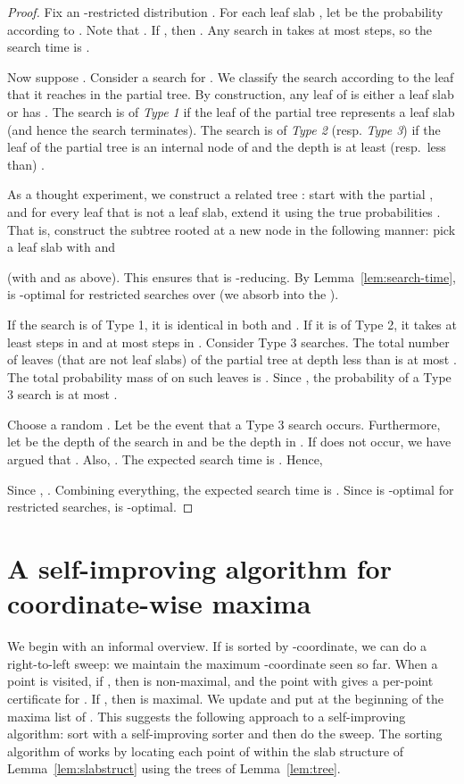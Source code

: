 \documentclass[letterpaper,11pt]{article}
\begin{document}
\begin{proof}
Fix an -restricted
distribution . For each leaf
slab , let  
be the probability according to 
. Note that 
.
If , 
then .
Any search in  takes at 
most  steps,
so the search time is
.

Now suppose . 
Consider a search for .
We classify the search according to 
the leaf that it reaches in
the partial tree.
By construction, any leaf 
of  is either a leaf slab or
has .
The search is of \emph{Type 1} 
if the leaf of the partial tree 
represents a leaf slab (and 
hence the search terminates). 
The search is of \emph{Type 2} 
(resp. \emph{Type 3}) if the 
leaf of the partial tree 
is an internal node of 
and the depth is at least 
(resp.~less than) . 

As a thought experiment,
we construct a related tree 
: start with the partial 
, and for every leaf that 
is not a leaf slab, extend it 
using the true 
probabilities . That  
is, construct the 
subtree rooted at a new node 
in the following manner: pick a leaf 
slab  with
 and
 
(with  and  as above). 
This ensures that  is 
-reducing.
By Lemma~\ref{lem:search-time},  
is -optimal for restricted 
searches over  (we absorb 
 into the ).


If the search is of Type 1, 
it is identical in both  
and . If
it is of Type 2, it 
takes at least  
steps in  and at most
 steps 
in . 
Consider Type 3 searches.
The total number of leaves 
(that are not leaf slabs)
of the partial tree at depth 
less than  is 
at most .
The total probability mass 
of  on such leaves is 
.
Since ,
the probability of a Type 3 
search is at most .

Choose a random .
Let  be the event that 
a Type 3 search occurs. Furthermore, 
let  be the depth of the search 
in  and  be
the depth in . 
If  does not occur, 
we have argued that .
Also, . 
The expected search time is .
Hence,
	
Since ,
.
Combining everything, the 
expected search time is 
. 
Since  is -optimal 
for restricted searches, 
 is -optimal.
\end{proof}




\section{A self-improving algorithm for coordinate-wise maxima}

We begin with an informal overview.
If  is sorted by -coordinate, we
can do a
right-to-left sweep:
we maintain the maximum -coordinate  
seen so far. When a point  is visited,
if , then  is non-maximal, and the point  with
 gives a per-point certificate for .
If , then  is maximal. We update  and put
 at the beginning of the maxima list of .
This suggests the following approach to a 
self-improving algorithm: sort  with a 
self-improving sorter and then do the 
sweep. The sorting algorithm of \cite{AilonCCLMS11} 
works by locating each point of  within 
the slab structure  of 
Lemma~\ref{lem:slabstruct} using the trees  of
Lemma~\ref{lem:tree}.
\end{document}
